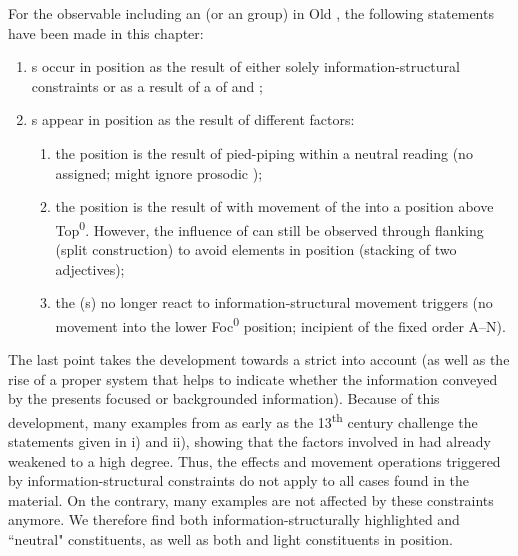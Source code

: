 \documentclass[output=paper,colorlinks,citecolor=brown]{langscibook}
\begin{document}
For the observable  including an   (or an
 group) in Old , the following statements have been
made in this chapter:

\begin{enumerate}
\def\labelenumi{\roman{enumi})}
\item
  s occur in  position as the result of either
  solely in\-for\-ma\-tion-struc\-tur\-al constraints or as a result of a
   of  and ;
\item
  s appear in  position as the result of different
  factors:

  \begin{enumerate}
  \def\labelenumii{\alph{enumii}.}
  \item
    the  position is the result of pied-piping within a
    neutral reading (no  assigned; might ignore prosodic
    );
  \item
    the  position is the result of  with movement of
    the  into a position above Top\textsuperscript{0}. However, the influence of
     can still be observed through flanking (split
    construction) to avoid  elements in  position
    (stacking of two adjectives);
  \item
    the (s) no longer react to information-structural
    movement triggers (no movement into the lower Foc\textsuperscript{0} position;
    incipient  of the fixed order A--N).
  \end{enumerate}
\end{enumerate}

The last point takes the development towards a strict  into
account (as well as the rise of a proper  system that helps
to indicate whether the information conveyed by the  presents
focused or backgrounded information). Because of this development, many examples from as early as the 13\textsuperscript{th} century challenge the
statements given in i) and ii), showing that the factors
involved in   had already weakened to a high degree.
Thus, the  effects and movement operations triggered by
information-structural constraints do not apply to all cases found in
the  material. On the contrary, many examples are not affected by
these constraints anymore. We therefore find both information-structurally
highlighted and ``neutral" constituents, as well as both  and light
constituents in  position.
\end{document}
